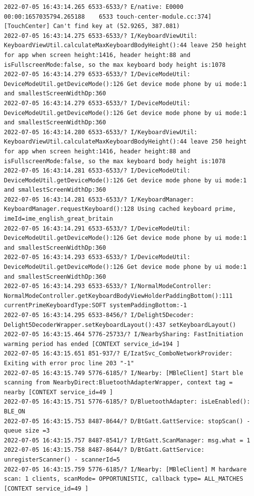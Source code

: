 \documentclass[a4paper,12pt]{book}
\begin{document}
\begin{lstlisting}
2022-07-05 16:43:14.265 6533-6533/? E/native: E0000 00:00:1657035794.265188    6533 touch-center-module.cc:374] [TouchCenter] Can't find key at (52.9265, 387.081)
2022-07-05 16:43:14.275 6533-6533/? I/KeyboardViewUtil: KeyboardViewUtil.calculateMaxKeyboardBodyHeight():44 leave 250 height for app when screen height:1416, header height:88 and isFullscreenMode:false, so the max keyboard body height is:1078
2022-07-05 16:43:14.279 6533-6533/? I/DeviceModeUtil: DeviceModeUtil.getDeviceMode():126 Get device mode phone by ui mode:1 and smallestScreenWidthDp:360
2022-07-05 16:43:14.279 6533-6533/? I/DeviceModeUtil: DeviceModeUtil.getDeviceMode():126 Get device mode phone by ui mode:1 and smallestScreenWidthDp:360
2022-07-05 16:43:14.280 6533-6533/? I/KeyboardViewUtil: KeyboardViewUtil.calculateMaxKeyboardBodyHeight():44 leave 250 height for app when screen height:1416, header height:88 and isFullscreenMode:false, so the max keyboard body height is:1078
2022-07-05 16:43:14.281 6533-6533/? I/DeviceModeUtil: DeviceModeUtil.getDeviceMode():126 Get device mode phone by ui mode:1 and smallestScreenWidthDp:360
2022-07-05 16:43:14.281 6533-6533/? I/KeyboardManager: KeyboardManager.requestKeyboard():128 Using cached keyboard prime, imeId=ime_english_great_britain
2022-07-05 16:43:14.291 6533-6533/? I/DeviceModeUtil: DeviceModeUtil.getDeviceMode():126 Get device mode phone by ui mode:1 and smallestScreenWidthDp:360
2022-07-05 16:43:14.293 6533-6533/? I/DeviceModeUtil: DeviceModeUtil.getDeviceMode():126 Get device mode phone by ui mode:1 and smallestScreenWidthDp:360
2022-07-05 16:43:14.293 6533-6533/? I/NormalModeController: NormalModeController.getKeyboardBodyViewHolderPaddingBottom():111 currentPrimeKeyboardType:SOFT systemPaddingBottom:-1
2022-07-05 16:43:14.295 6533-8456/? I/Delight5Decoder: Delight5DecoderWrapper.setKeyboardLayout():437 setKeyboardLayout()
2022-07-05 16:43:15.464 5776-25733/? I/NearbySharing: FastInitiation warming period has ended [CONTEXT service_id=194 ]
2022-07-05 16:43:15.651 851-937/? E/IzatSvc_ComboNetworkProvider: Exiting with error proc line 203 "-1"
2022-07-05 16:43:15.749 5776-6185/? I/Nearby: [MBleClient] Start ble scanning from NearbyDirect:BluetoothAdapterWrapper, context tag = nearby [CONTEXT service_id=49 ]
2022-07-05 16:43:15.751 5776-6185/? D/BluetoothAdapter: isLeEnabled(): BLE_ON
2022-07-05 16:43:15.753 8487-8644/? D/BtGatt.GattService: stopScan() - queue size =3
2022-07-05 16:43:15.757 8487-8541/? I/BtGatt.ScanManager: msg.what = 1
2022-07-05 16:43:15.758 8487-8644/? D/BtGatt.GattService: unregisterScanner() - scannerId=5
2022-07-05 16:43:15.759 5776-6185/? I/Nearby: [MBleClient] M hardware scan: 1 clients, scanMode= OPPORTUNISTIC, callback type= ALL_MATCHES [CONTEXT service_id=49 ]

\end{lstlisting}
\end{document}
